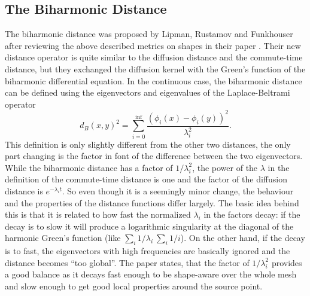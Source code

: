 \subsection{The Biharmonic Distance}
The biharmonic distance was proposed by Lipman, Rustamov and Funkhouser after reviewing the above described metrics on shapes in their paper \cite{lipman2010biharmonic}.
Their new distance operator is quite similar to the diffusion distance and the commute-time distance, but they exchanged the diffusion kernel with the Green's function of the biharmonic differential equation.
In the continuous case, the biharmonic distance can be defined using the eigenvectors and eigenvalues of the Laplace-Beltrami operator
\begin{equation}
	d_B(x,y)^2 = \sum_{i=0}^{\inf} \frac{(\phi_i(x) - \phi_i(y))^2}{\lambda_i^2}.
	\label{eq:biharmonic}
\end{equation}
This definition is only slightly different from the other two distances, the only part changing is the factor in font of the difference between the two eigenvectors.
While the biharmonic distance has a factor of $1/\lambda_i^2$, the power of the $\lambda$ in the definition of the commute-time distance is one and the factor of the diffusion distance is $e^{-\lambda_it}.$
So even though it is a seemingly minor change, the behaviour and the properties of the distance functions differ largely.
The basic idea behind this is that it is related to how fast the normalized $\lambda_i$ in the factors decay:
if the decay is to slow it will produce a logarithmic singularity at the diagonal of the harmonic Green's function (like $\sum_i 1/\lambda_i ~ \sum_i 1/i$).
On the other hand, if the decay is to fast, the eigenvectors with high frequencies are basically ignored and the distance becomes ``too global''.
The paper states, that the factor of $1/\lambda_i^2$ provides a good balance as it decays fast enough to be shape-aware over the whole mesh and slow enough to get good local properties around the source point.

